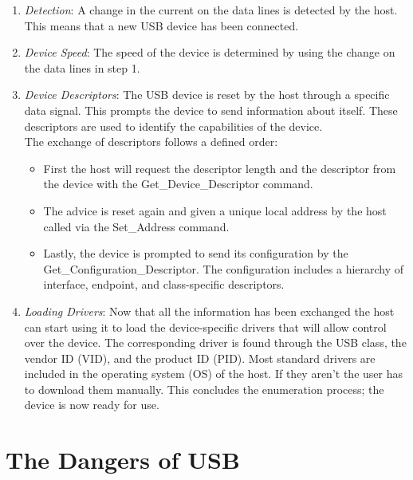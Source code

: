 \begin{enumerate}
    \item \emph{Detection}: A change in the current on the data lines is detected by the host. This means that a new USB device has been connected.
    \item \emph{Device Speed}: The speed of the device is determined by using the change on the data lines in step 1.
    \item \emph{Device Descriptors}: The USB device is reset by the host through a specific data signal. This prompts the device to send information about itself. These descriptors are used to identify the capabilities of the device.  \\
    The exchange of descriptors follows a defined order: 
    \begin{itemize}
        \item First the host will request the descriptor length and the descriptor from the device with the Get\_Device\_Descriptor command.
        \item The advice is reset again and given a unique local address by the host called via the Set\_Address command. 
        \item Lastly, the device is prompted to send its configuration by the \\ Get\_Configuration\_Descriptor. The configuration includes a hierarchy of interface, endpoint, and class-specific descriptors.  
    \end{itemize}
    \item \emph{Loading Drivers}: Now that all the information has been exchanged the host can start using it to load the device-specific drivers that will allow control over the device. The corresponding driver is found through the USB class, the vendor ID (VID), and the product ID (PID). Most standard drivers are included in the operating system (OS) of the host. If they aren't the user has to download them manually. This concludes the enumeration process; the device is now ready for use.
\end{enumerate}




\section{The Dangers of USB} \label{TheDangersOfUSB}


